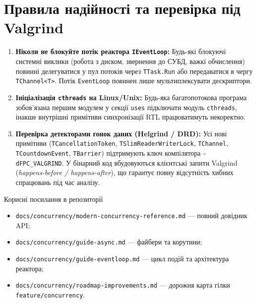\documentclass[11pt,a4paper]{article}
\begin{document}
\newpage

\section{Правила надійності та перевірка під Valgrind}

\begin{enumerate}
  \item \textbf{Ніколи не блокуйте потік реактора \texttt{IEventLoop}:} Будь-які блокуючі системні виклики (робота з диском, звернення до СУБД, важкі обчислення) повинні делегуватися у пул потоків через \texttt{TTask.Run} або передаватися в чергу \texttt{TChannel<T>}. Потік \texttt{EventLoop} повинен лише мультиплексувати дескриптори.
  \item \textbf{Ініціалізація \texttt{cthreads} на Linux/Unix:} Будь-яка багатопотокова програма зобов'язана першим модулем у секції \texttt{uses} підключати модуль \texttt{cthreads}, інакше внутрішні примітиви синхронізації RTL працюватимуть некоректно.
  \item \textbf{Перевірка детекторами гонок даних (Helgrind / DRD):} Усі нові примітиви (\texttt{TCancellationToken}, \texttt{TSlimReaderWriterLock}, \texttt{TChannel}, \texttt{TCountdownEvent}, \texttt{TBarrier}) підтримують ключ компілятора \texttt{-dFPC\_VALGRIND}. У бінарний код вбудовуються клієнтські запити Valgrind (\emph{happens-before / happens-after}), що гарантує повну відсутність хибних спрацювань під час аналізу.
\end{enumerate}

\begin{infobox}{Корисні посилання в репозиторії}
\begin{itemize}
  \item \texttt{docs/concurrency/modern-concurrency-reference.md} --- повний довідник API;
  \item \texttt{docs/concurrency/guide-async.md} --- файбери та корутини;
  \item \texttt{docs/concurrency/guide-eventloop.md} --- цикл подій та архітектура реактора;
  \item \texttt{docs/concurrency/roadmap-improvements.md} --- дорожня карта гілки \texttt{feature/concurrency}.
\end{itemize}
\end{infobox}
\end{document}
